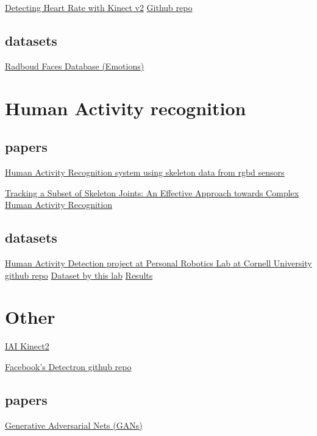\href{https://blogs.msdn.microsoft.com/kinectforwindows/2015/06/12/detecting-heart-rate-with-kinect/}{Detecting Heart Rate with Kinect v2}
\href{https://github.com/dngoins/Kinectv2HeartRate}{Github repo}

\subsection{datasets}
\href{http://www.socsci.ru.nl:8180/RaFD2/RaFD?p=main}{Radboud Faces Database (Emotions)}



\section{Human Activity recognition}
\subsection{papers}

\href{https://www.hindawi.com/journals/cin/2016/4351435/}{Human Activity Recognition system using skeleton data from rgbd sensors}

\href{https://www.hindawi.com/journals/jr/2017/7610417/}{Tracking a Subset of Skeleton Joints: An Effective Approach towards Complex Human Activity Recognition}

\subsection{datasets}

\href{https://github.com/jysung/activity_detection}{Human Activity Detection project at Personal Robotics Lab at Cornell University github repo}
\href{http://pr.cs.cornell.edu/humanactivities/data.php#format}{Dataset by this lab}
\href{http://pr.cs.cornell.edu/humanactivities/results.php}{Results}


\section{Other}
\href{https://github.com/code-iai/iai_kinect2}{IAI Kinect2}

\href{https://github.com/facebookresearch/Detectron}{Facebook's Detectron github repo}

\subsection{papers}
\href{https://arxiv.org/pdf/1406.2661.pdf}{Generative Adversarial Nets (GANs)}

